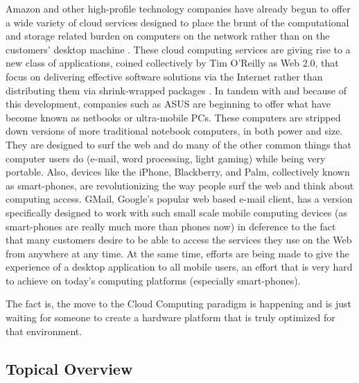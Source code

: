 \documentclass[12pt,oneside,letterpaper,titlepage]{article}
\begin{document}
Amazon and other high-profile technology companies have already begun to offer a
wide variety of cloud services designed to place the brunt of the computational
and storage related burden on computers on the network rather than on the
customers' desktop machine \citep{reiss2008}.  These cloud computing services
are giving rise to a new class of applications, coined collectively by Tim
O'Reilly as Web 2.0, that focus on delivering effective software solutions via
the Internet rather than distributing them via shrink-wrapped packages
\citep{bleicher2006}.  In tandem with and because of this development, companies
such as ASUS are beginning to offer what have become known as netbooks or
ultra-mobile PCs.  These computers are stripped down versions of more
traditional notebook computers, in both power and size.  They are designed to
surf the web and do many of the other common things that computer users do
(e-mail, word processing, light gaming) while being very portable.  Also,
devices like the iPhone, Blackberry, and Palm, collectively known as
smart-phones, are revolutionizing the way people surf the web and think about
computing access.  GMail, Google's popular web based e-mail client, has a
version specifically designed to work with such small scale mobile computing
devices (as smart-phones are really much more than phones now) in deference to
the fact that many customers desire to be able to access the services they use
on the Web from anywhere at any time.  At the same time, efforts are being made
to give the experience of a desktop application to all mobile users, an effort
that is very hard to achieve on today's computing platforms (especially
smart-phones).

The fact is, the move to the Cloud Computing paradigm is happening and is just
waiting for someone to create a hardware platform that is truly optimized for
that environment.

\subsection{Topical Overview}
\end{document}
